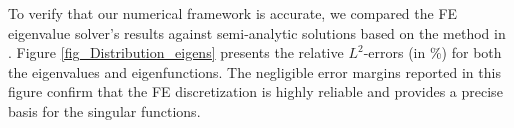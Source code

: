 \documentclass[oneside]{article}
\begin{document}
\noindent To verify that our numerical framework is accurate, we compared the FE eigenvalue solver's results against semi-analytic solutions based on the method in \cite{taylor2024regularity}. Figure \ref{fig_Distribution_eigens} presents the relative $L^2$-errors (in \%) for both the eigenvalues and eigenfunctions. The negligible error margins reported in this figure confirm that the FE discretization is highly reliable and provides a precise basis for the singular functions.









\end{document}
